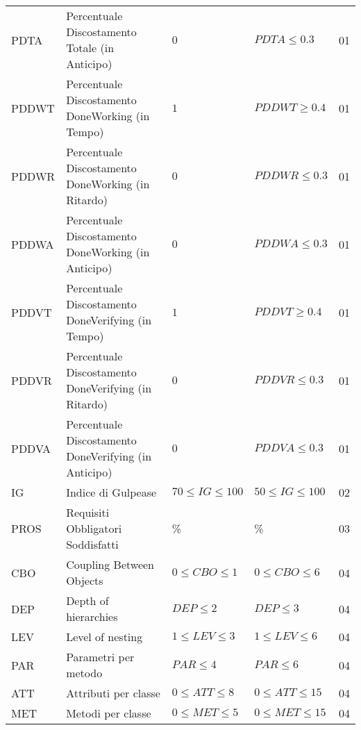 \begin{longtable}{ 
		>{\centering}p{} 
		>{}p{}
        >{\centering}p{}
        >{\centering}p{}
        >{}p{} }
            PDTA & Percentuale Discostamento Totale (in Anticipo) & $0$ & $PDTA \leq 0.3$ & 01 \\

            PDDWT & Percentuale Discostamento DoneWorking (in Tempo) & $1$ & $PDDWT \geq 0.4$ & 01 \\

            PDDWR & Percentuale Discostamento DoneWorking (in Ritardo) & $0$ & $PDDWR \leq 0.3$ & 01 \\   
            
            PDDWA & Percentuale Discostamento DoneWorking (in Anticipo) & $0$ & $PDDWA \leq 0.3$ & 01 \\

            PDDVT & Percentuale Discostamento DoneVerifying (in Tempo) & $1$ & $PDDVT \geq 0.4$ & 01 \\

            PDDVR & Percentuale Discostamento DoneVerifying (in Ritardo) & $0$ & $PDDVR \leq 0.3$ & 01 \\   
            
            PDDVA & Percentuale Discostamento DoneVerifying (in Anticipo) & $0$ & $PDDVA \leq 0.3$ & 01 \\

            IG & Indice di Gulpease & $70 \leq IG \leq 100$ & $50 \leq IG \leq 100$ & 02 \\

            PROS & Requisiti Obbligatori Soddisfatti & 100\% & 100\% & 03 \\

            CBO & Coupling Between Objects & $0\leq CBO \leq 1$ & $0\leq CBO \leq 6$ & 04 \\

            DEP & Depth of hierarchies & $DEP \leq 2$ & $DEP \leq 3$ & 04 \\

            LEV & Level of nesting & $1\leq LEV \leq 3$ & $1\leq LEV \leq 6$ & 04 \\

            PAR & Parametri per metodo & $PAR \leq 4$ & $PAR \leq 6$ & 04 \\

            ATT & Attributi per classe & $0 \leq ATT \leq 8$ & $0 \leq ATT \leq 15$ & 04 \\

            MET & Metodi per classe & $0 \leq MET \leq 5$ & $0 \leq MET \leq 15$ & 04 \\


\end{longtable}
